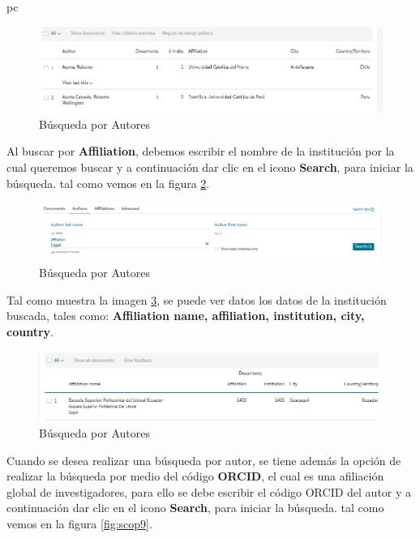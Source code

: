 pc\documentclass[a4paper,12pt,openany]{book}
\begin{document}
\begin{itemize}
\begin{itemize}
        \begin{figure}[H]
        \centering
    	\includegraphics[width=12cm]{Scop6.png}
        \caption{Búsqueda por Autores}
        \label{fig:scop6}
        \end{figure}

Al buscar por \textbf{Affiliation}, debemos escribir el nombre de la institución por la cual queremos buscar y a continuación dar clic en el icono \textbf{Search}, para iniciar la búsqueda. tal como vemos en la figura \ref{fig:scop7}.  

        \begin{figure}[H]
        \centering
    	\includegraphics[width=12cm]{Scop7.png}
        \caption{Búsqueda por Autores}
        \label{fig:scop7}
        \end{figure}

Tal como muestra la imagen \ref{fig:scop8}, se puede ver datos los datos de la institución buscada, tales como: \textbf{Affiliation name, affiliation, institution, city, country}.

        \begin{figure}[H]
        \centering
    	\includegraphics[width=12cm]{Scop8.png}
        \caption{Búsqueda por Autores}
        \label{fig:scop8}
        \end{figure}

Cuando se desea realizar una búsqueda por autor, se tiene además la opción de realizar la búsqueda por medio del código \textbf{ORCID}, el cual es una afiliación global de investigadores, para ello se debe escribir el código ORCID del autor y a continuación dar clic en el icono \textbf{Search}, para iniciar la búsqueda. tal como vemos en la figura \ref{fig:scop9}.  


\end{itemize}
\end{itemize}
\end{document}
